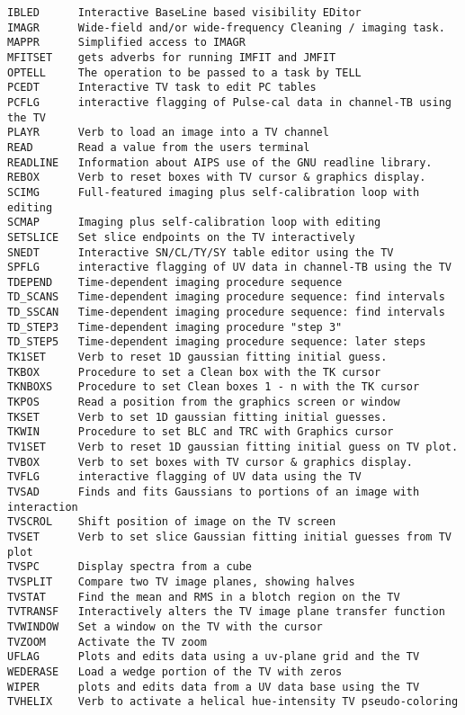 \begin{verbatim}
IBLED      Interactive BaseLine based visibility EDitor
IMAGR      Wide-field and/or wide-frequency Cleaning / imaging task.
MAPPR      Simplified access to IMAGR
MFITSET    gets adverbs for running IMFIT and JMFIT
OPTELL     The operation to be passed to a task by TELL
PCEDT      Interactive TV task to edit PC tables
PCFLG      interactive flagging of Pulse-cal data in channel-TB using the TV
PLAYR      Verb to load an image into a TV channel
READ       Read a value from the users terminal
READLINE   Information about AIPS use of the GNU readline library.
REBOX      Verb to reset boxes with TV cursor & graphics display.
SCIMG      Full-featured imaging plus self-calibration loop with editing
SCMAP      Imaging plus self-calibration loop with editing
SETSLICE   Set slice endpoints on the TV interactively
SNEDT      Interactive SN/CL/TY/SY table editor using the TV
SPFLG      interactive flagging of UV data in channel-TB using the TV
TDEPEND    Time-dependent imaging procedure sequence
TD_SCANS   Time-dependent imaging procedure sequence: find intervals
TD_SSCAN   Time-dependent imaging procedure sequence: find intervals
TD_STEP3   Time-dependent imaging procedure "step 3"
TD_STEP5   Time-dependent imaging procedure sequence: later steps
TK1SET     Verb to reset 1D gaussian fitting initial guess.
TKBOX      Procedure to set a Clean box with the TK cursor
TKNBOXS    Procedure to set Clean boxes 1 - n with the TK cursor
TKPOS      Read a position from the graphics screen or window
TKSET      Verb to set 1D gaussian fitting initial guesses.
TKWIN      Procedure to set BLC and TRC with Graphics cursor
TV1SET     Verb to reset 1D gaussian fitting initial guess on TV plot.
TVBOX      Verb to set boxes with TV cursor & graphics display.
TVFLG      interactive flagging of UV data using the TV
TVSAD      Finds and fits Gaussians to portions of an image with interaction
TVSCROL    Shift position of image on the TV screen
TVSET      Verb to set slice Gaussian fitting initial guesses from TV plot
TVSPC      Display spectra from a cube
TVSPLIT    Compare two TV image planes, showing halves
TVSTAT     Find the mean and RMS in a blotch region on the TV
TVTRANSF   Interactively alters the TV image plane transfer function
TVWINDOW   Set a window on the TV with the cursor
TVZOOM     Activate the TV zoom
UFLAG      Plots and edits data using a uv-plane grid and the TV
WEDERASE   Load a wedge portion of the TV with zeros
WIPER      plots and edits data from a UV data base using the TV
TVHELIX    Verb to activate a helical hue-intensity TV pseudo-coloring
\end{verbatim}\eve

